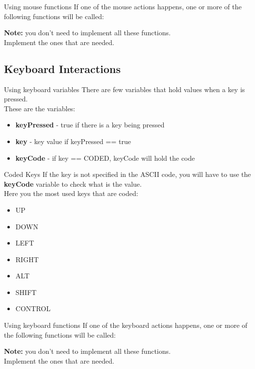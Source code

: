 \documentclass{beamer}
\begin{document}
\begin{frame}{Using mouse functions}
If one of the mouse actions happens, one or more of the following functions will be called:\\

\lstMouse

\textbf{Note: } you don't need to implement all these functions.\\
Implement the ones that are needed.
\end{frame}

\subsection{Keyboard Interactions}

\begin{frame}{Using keyboard variables}
There are few variables that hold values when a key is pressed.\\
These are the variables:\\

\begin{itemize}
\item{\textbf{keyPressed} - true if there is a key being pressed}
\item{\textbf{key} - key value if keyPressed == true}
\item{\textbf{keyCode} - if key == CODED, keyCode will hold the code}
\end{itemize}
\end{frame}

\begin{frame}{Coded Keys}
If the key is not specified in the ASCII code, you will have to use 
the \textbf{keyCode} variable to check what is the value.\\
Here you the most used keys that are coded:\\

\begin{itemize}
\item{UP}
\item{DOWN}
\item{LEFT}
\item{RIGHT}
\item{ALT}
\item{SHIFT}
\item{CONTROL}
\end{itemize}
\end{frame}

\begin{frame}{Using keyboard functions}
If one of the keyboard actions happens, one or more of the following functions will be called:\\

\lstKeyboard

\textbf{Note: } you don't need to implement all these functions.\\
Implement the ones that are needed.
\end{frame}
\end{document}
